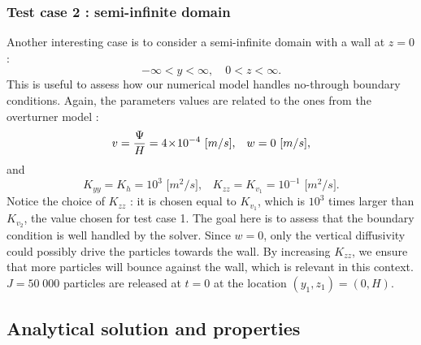 \subsubsection{Test case 2 : semi-infinite domain}
Another interesting case is to consider a semi-infinite domain with a wall at $z=0$ :
\begin{equation}
	-\infty < y < \infty,\quad 0 < z < \infty.
\end{equation}
This is useful to assess how our numerical model handles no-through boundary conditions. Again, the parameters values are related to the ones from the overturner model :
\begin{equation}
	v = \frac{\Psi}{H} = 4\!\times\!10^{-4}\mbox{ [$m/s$],}\quad  w = 0\mbox{ [$m/s$],}
\end{equation}
and
\begin{equation}
	K_{yy} = K_h = 10^{3} \mbox{ [$m^2/s$],}\quad K_{zz} = K_{v_{1}} = 10^{-1} \mbox{ [$m^2/s$].} 
\end{equation}
Notice the choice  of $K_{zz}$ : it is chosen equal to $K_{v_1}$, which is $10^3$ times larger than $K_{v_2}$, the value chosen for test case 1. The goal here is to assess that the boundary condition is well handled by the solver. Since $w=0$, only the vertical diffusivity could possibly drive the particles towards the wall. By increasing $K_{zz}$, we ensure that more particles will bounce against the wall, which is relevant in this context. $J = 50\;000$ particles are released at $t=0$ at the location $(y_1,z_1) = (0,H)$.



\subsection{Analytical solution and properties}
